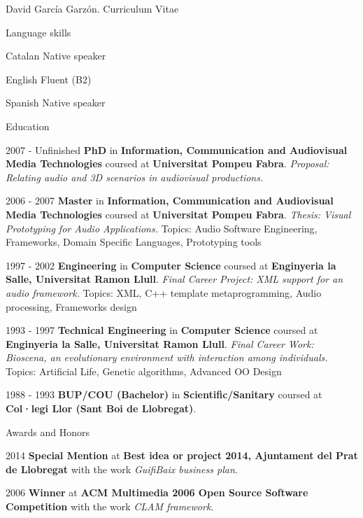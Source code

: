 \documentclass{article}
\begin{document}
\begin{cv}{David García Garzón. Curriculum Vitae}
\begin{cvlist}{Language skills}
\item[Catalan] Native speaker
\item[English] Fluent (B2)
\item[Spanish] Native speaker

\end{cvlist}


\begin{cvlist}{Education}

\item[2007 - Unfinished]
{\bf PhD} in {\bf Information, Communication and Audiovisual Media Technologies}
coursed at {\bf Universitat Pompeu Fabra}.
{\em Proposal: Relating audio and 3D scenarios in audiovisual productions.}
\item[2006 - 2007]
{\bf Master} in {\bf Information, Communication and Audiovisual Media Technologies}
coursed at {\bf Universitat Pompeu Fabra}.
{\em Thesis: Visual Prototyping for Audio Applications.}
Topics: Audio Software Engineering, Frameworks, Domain Specific Languages, Prototyping tools
\item[1997 - 2002]
{\bf Engineering} in {\bf Computer Science}
coursed at {\bf Enginyeria la Salle, Universitat Ramon Llull}.
{\em Final Career Project: XML support for an audio framework.}
Topics: XML, C++ template metaprogramming, Audio processing, Frameworks design
\item[1993 - 1997]
{\bf Technical Engineering} in {\bf Computer Science}
coursed at {\bf Enginyeria la Salle, Universitat Ramon Llull}.
{\em Final Career Work: Bioscena, an evolutionary environment with interaction among individuals.}
Topics: Artificial Life, Genetic algorithms, Advanced OO Design
\item[1988 - 1993]
{\bf BUP/COU (Bachelor)} in {\bf Scientific/Sanitary}
coursed at {\bf Col·legi Llor (Sant Boi de Llobregat)}.
{\em }
\end{cvlist}

\begin{cvlist}{Awards and Honors}

\item[2014]
{\bf Special Mention}
at {\bf Best idea or project 2014, Ajuntament del Prat de Llobregat}
with the work {\em GuifiBaix business plan}.
\item[2006]
{\bf Winner}
at {\bf ACM Multimedia 2006 Open Source Software Competition}
with the work {\em CLAM framework}.
\end{cvlist}


\end{cv}
\end{document}
